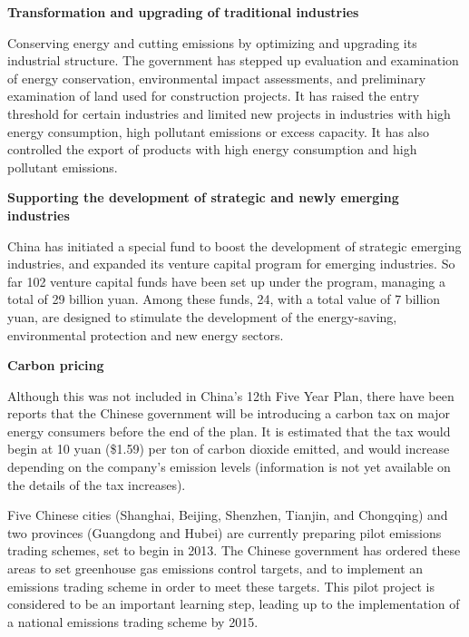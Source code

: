 \textbf{Transformation and upgrading of traditional industries}



Conserving energy and cutting emissions by optimizing and upgrading its industrial structure. 
The government has stepped up evaluation and examination of energy conservation, environmental impact assessments, and preliminary examination of land used for construction projects. 
It has raised the entry threshold for certain industries and limited new projects in industries with high energy consumption, high pollutant emissions or excess capacity. 
It has also controlled the export of products with high energy consumption and high pollutant emissions. 



\textbf{Supporting the development of strategic and newly emerging industries}



China has initiated a special fund to boost the development of strategic emerging industries, and expanded its venture capital program for emerging industries. 
So far 102 venture capital funds have been set up under the program, managing a total of 29 billion yuan. 
Among these funds, 24, with a total value of 7 billion yuan, are designed to stimulate the development of the energy-saving, environmental protection and new energy sectors.




\textbf{Carbon pricing}



Although this was not included in China’s 12th Five Year Plan, there have been reports that the Chinese government will be introducing a carbon tax on major energy consumers before the end of the plan. 
It is estimated that the tax would begin at 10 yuan (\$1.59) per ton of carbon dioxide emitted, and would increase depending on the company’s emission levels (information is not yet available on the details of the tax increases).



Five Chinese cities (Shanghai, Beijing, Shenzhen, Tianjin, and Chongqing) and two provinces (Guangdong and Hubei) are currently preparing pilot emissions trading schemes, set to begin in 2013. 
The Chinese government has ordered these areas to set greenhouse gas emissions control targets, and to implement an emissions trading scheme in order to meet these targets. 
This pilot project is considered to be an important learning step, leading up to the implementation of a national emissions trading scheme by 2015.



